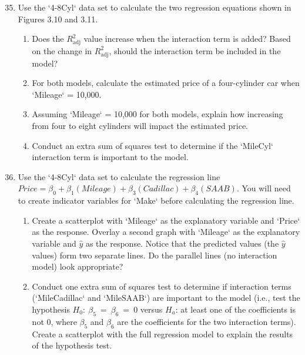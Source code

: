 \documentclass[
]{report}
\begin{document}
\begin{enumerate}
\setcounter{enumi}{34}
\item Use the `4-8Cyl` data set to calculate the two regression equations shown in Figures 3.10 and 3.11.

\begin{enumerate}
\item Does the $\scriptstyle R^2_{\text{adj}}$ value increase when the interaction term is added? Based on the change in $\scriptstyle R^2_{\text{adj}}$, should the interaction term be included in the model?
\item For both models, calculate the estimated price of a four-cylinder car when `Mileage` = 10,000.
\item Assuming `Mileage` = 10,000 for both models, explain how increasing from four to eight cylinders will impact the estimated price.
\item Conduct an extra sum of squares test to determine if the `MileCyl` interaction term is important to the model.
\end{enumerate}

\item  Use the `4-8Cyl` data set to calculate the regression line $\scriptstyle Price = \beta_0 + \beta_1(Mileage) + \beta_3(Cadillac) + \beta_4(SAAB)$. You will need to create indicator variables for `Make` before calculating the regression line.

\begin{enumerate}
\item Create a scatterplot with `Mileage` as the explanatory variable and `Price` as the response. Overlay a second graph with `Mileage` as the explanatory variable and $\scriptstyle \hat y$ as the response. Notice that the predicted values (the $\scriptstyle \hat y$ values) form two separate lines. Do the parallel lines (no interaction model) look appropriate?
\item Conduct one extra sum of squares test to determine if interaction terms (`MileCadillac` and `MileSAAB`) are important to the model (i.e., test the hypothesis $\scriptstyle H_0:\  \beta_5 \ =\  \beta_6 \ =\  0$ versus $\scriptstyle H_a$: at least one of the coefficients is not 0, where $\scriptstyle \beta_5$ and $\scriptstyle \beta_6$ are the coefficients for the two interaction terms). Create a scatterplot with the full regression model to explain the results of the hypothesis test.
\end{enumerate}
\end{enumerate}
\end{document}
